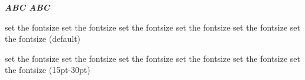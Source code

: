 \documentclass[twoside]{ctexart}
\begin{document}
            {\sffamily\large\bfseries\itshape ABC \normalsize\normalfont ABC}

            set the fontsize set the fontsize set the fontsize set the fontsize set the fontsize set the fontsize (default)

            {}

            {\fontsize{15}{30}\selectfont set the fontsize set the fontsize set the fontsize set the fontsize set the fontsize set the fontsize (15pt-30pt)\par}
\end{document}
